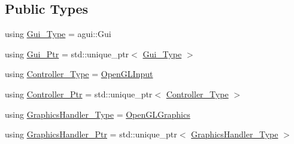 \subsection*{Public Types}
\begin{DoxyCompactItemize}
\item 
using \mbox{\hyperlink{classec_1_1_gui_system_a7f6534f297da47e8618dd1b9fed934ae}{Gui\+\_\+\+Type}} = agui\+::\+Gui
\item 
using \mbox{\hyperlink{classec_1_1_gui_system_a2ab0b1663243d1dbbf6624fd4c4d705e}{Gui\+\_\+\+Ptr}} = std\+::unique\+\_\+ptr$<$ \mbox{\hyperlink{classec_1_1_gui_system_a7f6534f297da47e8618dd1b9fed934ae}{Gui\+\_\+\+Type}} $>$
\item 
using \mbox{\hyperlink{classec_1_1_gui_system_a06ff8d5daa43acea2e7ff43964bb14dd}{Controller\+\_\+\+Type}} = \mbox{\hyperlink{classec_1_1_open_g_l_input}{Open\+G\+L\+Input}}
\item 
using \mbox{\hyperlink{classec_1_1_gui_system_acee0577f0fa43e3903e127a36c44909d}{Controller\+\_\+\+Ptr}} = std\+::unique\+\_\+ptr$<$ \mbox{\hyperlink{classec_1_1_gui_system_a06ff8d5daa43acea2e7ff43964bb14dd}{Controller\+\_\+\+Type}} $>$
\item 
using \mbox{\hyperlink{classec_1_1_gui_system_ace2e875c44326f620358ce6b1dfc3bc7}{Graphics\+Handler\+\_\+\+Type}} = \mbox{\hyperlink{classec_1_1_open_g_l_graphics}{Open\+G\+L\+Graphics}}
\item 
using \mbox{\hyperlink{classec_1_1_gui_system_ae77a3a2d795b58a982e181b2197ba6fa}{Graphics\+Handler\+\_\+\+Ptr}} = std\+::unique\+\_\+ptr$<$ \mbox{\hyperlink{classec_1_1_gui_system_ace2e875c44326f620358ce6b1dfc3bc7}{Graphics\+Handler\+\_\+\+Type}} $>$
\end{DoxyCompactItemize}
